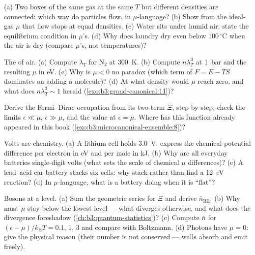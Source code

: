 \begin{exercise}[$\star$]\label{exo:b3:grand-canonical:1}
(a) Two boxes of the same gas at the same $T$ but different
densities are connected: which way do particles flow, in
$\mu$-language? (b) Show from the ideal-gas $\mu$ that flow stops
at equal densities. (c) Water sits under humid air: state the
equilibrium condition in $\mu$'s. (d) Why does laundry dry even
below $100\,^\circ$C when the air is dry (compare $\mu$'s, not
temperatures)?
\end{exercise}

\begin{exercise}[$\star$]\label{exo:b3:grand-canonical:2}
The  of air. (a) Compute $\lambda_T$ for N$_2$
at \qty{300}{K}. (b) Compute $n\lambda_T^3$ at \qty{1}{bar} and
the resulting $\mu$ in eV. (c) Why is $\mu < 0$ no paradox
(which term of $F = E - TS$ dominates on adding a molecule)? (d)
At what density would $\mu$ reach zero, and what does
$n\lambda_T^3 \sim 1$ herald
(\cref{exo:b3:grand-canonical:11})?
\end{exercise}

\begin{exercise}[$\star$]\label{exo:b3:grand-canonical:3}
Derive the Fermi--Dirac occupation from its two-term $\Xi$,
step by step; check the limits $\epsilon \ll \mu$, $\epsilon \gg
\mu$, and the value at $\epsilon = \mu$. Where has this function
already appeared in this book
(\cref{exo:b3:microcanonical-ensemble:8})?
\end{exercise}

\begin{exercise}[$\star$]\label{exo:b3:grand-canonical:4}
Volts are chemistry. (a) A lithium cell holds \qty{3.0}{V}:
express the chemical-potential difference per electron in eV and
per mole in kJ. (b) Why are all everyday batteries single-digit
volts (what sets the scale of chemical $\mu$ differences)? (c) A
lead--acid car battery stacks six cells: why stack rather than
find a \qty{12}{eV} reaction? (d) In $\mu$-language, what is a
battery doing when it is ``flat''?
\end{exercise}

\begin{exercise}[$\star\star$]\label{exo:b3:grand-canonical:5}
Bosons at a level. (a) Sum the geometric series for $\Xi$ and
derive $\bar n_{\text{BE}}$. (b) Why must $\mu$ stay below the
lowest level --- what diverges otherwise, and what does the
divergence foreshadow (\cref{ch:b3:quantum-statistics})? (c)
Compute $\bar n$ for $(\epsilon - \mu)/k_{\text{B}}T = 0.1$, $1$,
$3$ and compare with Boltzmann. (d) Photons have $\mu = 0$: give
the physical reason (their number is not conserved --- walls
absorb and emit freely).
\end{exercise}

